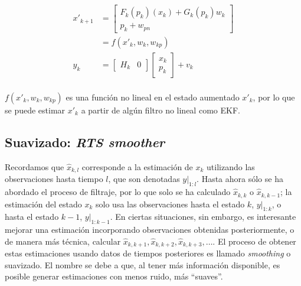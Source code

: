 \begin{equation}\label{eq:sistema-aumentado}
\begin{aligned}
x'_{k+1} &= \begin{bmatrix} F_k(p_k)(x_k) + G_k(p_k)w_k \\ p_k + w_{pn} \end{bmatrix} \\
&= f(x'_{k}, w_k, w_{kp}) \\
y_{k} &= \begin{bmatrix} H_k & 0 \end{bmatrix} \begin{bmatrix}x_k \\ p_k \end{bmatrix} + v_k \\ 
\end{aligned}
\end{equation}

\(f(x'_{k}, w_k, w_{kp}) \) es una función no lineal en el estado aumentado \(x'_k\), por lo que se puede estimar \(x'_k\) a partir de algún filtro no lineal como EKF.


\subsection{Suavizado: \textit{RTS smoother}} \label{smoother}


Recordamos que \(\hat{x}_{k,l}\) corresponde a la estimación de \(x_k\) utilizando las observaciones hasta tiempo \(l\), que son denotadas \(\left. y \right|_{1:l}\). Hasta ahora sólo se ha abordado el proceso de filtraje, por lo que solo se ha calculado \(\hat{x}_{k,k}\) o \(\hat{x}_{k, k-1}\); la estimación del estado \(x_k\) solo usa las observaciones hasta el estado \(k\), \(\left. y \right|_{1:k}\), o hasta el estado \(k-1\),   \(\left. y \right|_{1:k-1}\). En ciertas situaciones, sin embargo, es interesante mejorar una estimación incorporando observaciones obtenidas posteriormente, o de manera más técnica, calcular \(\hat{x}_{k, k+1}, \hat{x}_{k, k+2}, \hat{x}_{k, k+3}, \dots\). El proceso de obtener estas estimaciones usando datos de tiempos posteriores es llamado \textit{smoothing} o suavizado. El nombre se debe a que, al tener más información disponible, es posible generar estimaciones con menos ruido, más ``suaves''.

